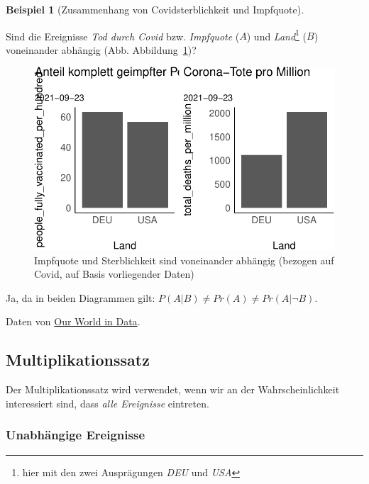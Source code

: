 \documentclass[
  a4paper,
  DIV=11]{scrreprt}
\theoremstyle{definition}
\newtheorem{example}{Beispiel}[chapter]
\theoremstyle{remark}
\begin{document}
\leavevmode{}%
\begin{example}[Zusammenhang von Covidsterblichkeit und
Impfquote]\label{exm-covid}

Sind die Ereignisse \emph{Tod durch Covid} bzw. \emph{Impfquote} (\(A\))
und \emph{Land}\footnote{hier mit den zwei Ausprägungen \emph{DEU} und
  \emph{USA}} (\(B\)) voneinander abhängig (Abb.
Abbildung~\ref{fig-covid1})?

\begin{figure}

{\centering \includegraphics{./Wskt_files/figure-pdf/fig-covid1-1.pdf}

}

\caption{\label{fig-covid1}Impfquote und Sterblichkeit sind voneinander
abhängig (bezogen auf Covid, auf Basis vorliegender Daten)}

\end{figure}

Ja, da in beiden Diagrammen gilt: \(P(A|B) \ne Pr(A) \ne Pr(A|\neg B)\).

Daten von \href{https://ourworldindata.org/covid-deaths}{Our World in
Data}.

\end{example}

\hypertarget{multiplikationssatz}{%
\subsection{Multiplikationssatz}\label{multiplikationssatz}}

Der Multiplikationssatz wird verwendet, wenn wir an der
Wahrscheinlichkeit interessiert sind, dass \emph{alle Ereignisse}
eintreten.

\hypertarget{unabhuxe4ngige-ereignisse}{%
\subsubsection{Unabhängige Ereignisse}\label{unabhuxe4ngige-ereignisse}}
\end{document}
